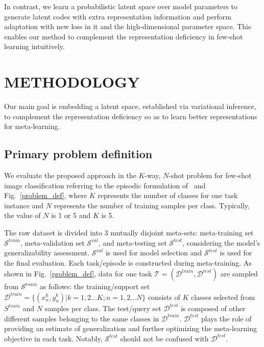 \documentclass[10pt,conference,a4paper]{IEEEtran}
\begin{document}
In contrast, we learn a probabilistic latent space over model parameters to generate latent codes with extra representation information and perform adaptation with new loss in it and the high-dimensional parameter space. This enables our method to complement the representation deficiency in few-shot learning intuitively.

\section{METHODOLOGY}
\label{sectionMETHODOLOGY}
Our main goal is embedding a latent space, established via variational inference, to complement the representation deficiency so as to learn better representations for meta-learning.

\subsection{Primary problem definition}
We evaluate the proposed approach in the $\mathit{K}$-way, $\mathit{N}$-shot problem for few-shot image classification referring to the episodic formulation of~\cite{vinyals2016matching} and Fig.~\ref{problem_def}, where $\mathit{K}$ represents the number of classes for one task instance and $\mathit{N}$ represents the number of training samples per class. Typically, the value of $\mathit{N}$ is 1 or 5 and $\mathit{K}$ is 5.

The raw dataset is divided into 3 mutually disjoint meta-sets: meta-training set $\mathcal{S}^{train}$, meta-validation set $\mathcal{S}^{val}$, and meta-testing set $\mathcal{S}^{test}$, considering the model's generalizability assessment. $\mathcal{S}^{val}$ is used for model selection and $\mathcal{S}^{test}$ is used for the final evaluation. Each task/episode is constructed during meta-training. As shown in Fig.~\ref{problem_def}, data for one task $\mathcal T = (\mathcal{D}^{train}, \mathcal{D}^{test})$ are sampled from $\mathcal{S}^{train}$ as follows: the training/support set $\mathcal{D}^{train} = \{ (x_{n}^{k}, y_{n}^{k}) | k = 1, 2...\mathit{K}; n = 1, 2...\mathit{N}\}$ consists of $\mathit{K}$ classes selected from $S^{train}$ and $\mathit{N}$ samples per class. The test/query set $\mathcal{D}^{test}$ is composed of other different samples belonging to the same classes in $\mathcal{D}^{train}$. $\mathcal{D}^{test}$ plays the role of providing an estimate of generalization and further optimizing the meta-learning objective in each task. Notably, $\mathcal{S}^{test}$ should not be confused with $\mathcal{D}^{test}$.
\end{document}
